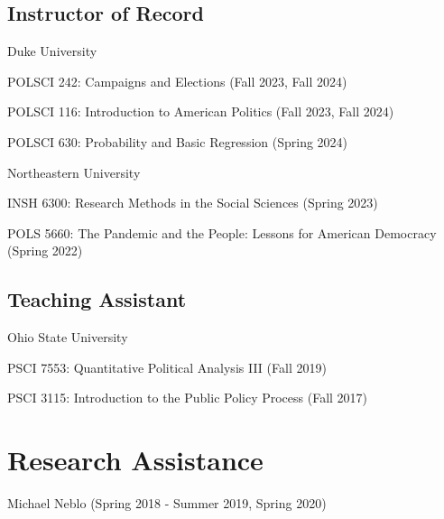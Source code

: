 \documentclass[letterpaper]{article}
\renewenvironment{itemize}{
  \begin{list}{}{
    \setlength{\leftmargin}{1.5em}
  }
}{
  \end{list}
}
\begin{document}
\subsection*{Instructor of Record}

\begin{itemize}

\item Duke University
	\begin{itemize}
	\item POLSCI 242: Campaigns and Elections (Fall 2023, Fall 2024)
	\item POLSCI 116: Introduction to American Politics (Fall 2023, Fall 2024)
	\item POLSCI 630: Probability and Basic Regression (Spring 2024)
	\end{itemize}

\item Northeastern University 
	\begin{itemize}
	\item INSH 6300: Research Methods in the Social Sciences (Spring 2023)
	\item POLS 5660: The Pandemic and the People: Lessons for American Democracy (Spring 2022)
	\end{itemize}
\end{itemize}

\subsection*{Teaching Assistant}

\begin{itemize}
\item Ohio State University 
\begin{itemize}
\item PSCI 7553: Quantitative Political Analysis III (Fall 2019)
\item PSCI 3115: Introduction to the Public Policy Process (Fall 2017)
\end{itemize}
\end{itemize}

\section*{Research Assistance}
\begin{itemize}
\item  Michael Neblo (Spring 2018 - Summer 2019, Spring 2020)
\end{itemize}
\end{document}
